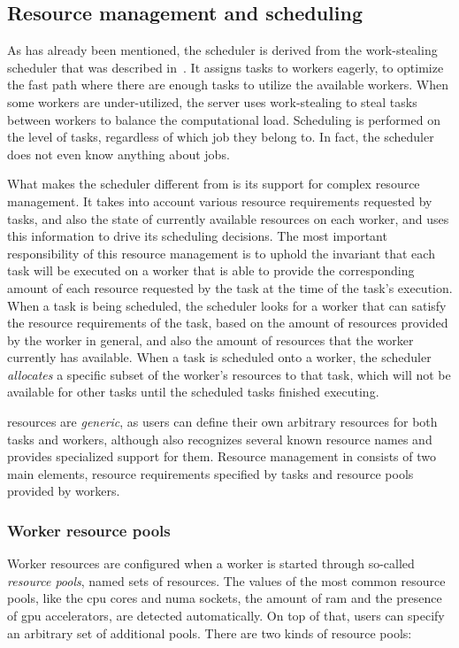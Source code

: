 \subsection{Resource management and scheduling}
\label{sec:hq-resource-management}
As has already been mentioned, the \hyperqueue{} scheduler is derived from the
\rsds{} work-stealing scheduler that was described in~. It
assigns tasks to workers eagerly, to optimize the fast path where there are enough tasks to utilize
the available workers. When some workers are under-utilized, the server uses work-stealing to steal
tasks between workers to balance the computational load. Scheduling is performed on the level of
tasks, regardless of which job they belong to. In fact, the scheduler does not even know anything
about jobs.

What makes the scheduler different from \rsds{} is its support for complex resource
management. It takes into account various resource requirements requested by tasks, and also the
state of currently available resources on each worker, and uses this information to drive its
scheduling decisions. The most important responsibility of this resource management is to uphold
the invariant that each task will be executed on a worker that is able to provide the corresponding
amount of each resource requested by the task at the time of the task's execution. When a task is
being scheduled, the scheduler looks for a worker that can satisfy the resource requirements of the
task, based on the amount of resources provided by the worker in general, and also the amount of
resources that the worker currently has available. When a task is scheduled onto a worker, the
scheduler \emph{allocates} a specific subset of the worker's resources to that task, which
will not be available for other tasks until the scheduled tasks finished executing.

\hyperqueue{} resources are \emph{generic}, as users can define their own
arbitrary resources for both tasks and workers, although \hq{} also recognizes
several known resource names and provides specialized support for them. Resource management in
\hyperqueue{} consists of two main elements, resource requirements specified by tasks and
resource pools provided by workers.

\subsubsection*{Worker resource pools}
Worker resources are configured when a worker is started through so-called \emph{resource pools},
named sets of resources. The values of the most common resource pools, like the
\gls{cpu} cores and \gls{numa} sockets, the amount of
\gls{ram} and the presence of \gls{gpu} accelerators, are detected
automatically. On top of that, users can specify an arbitrary set of additional pools. There are
two kinds of resource pools:


